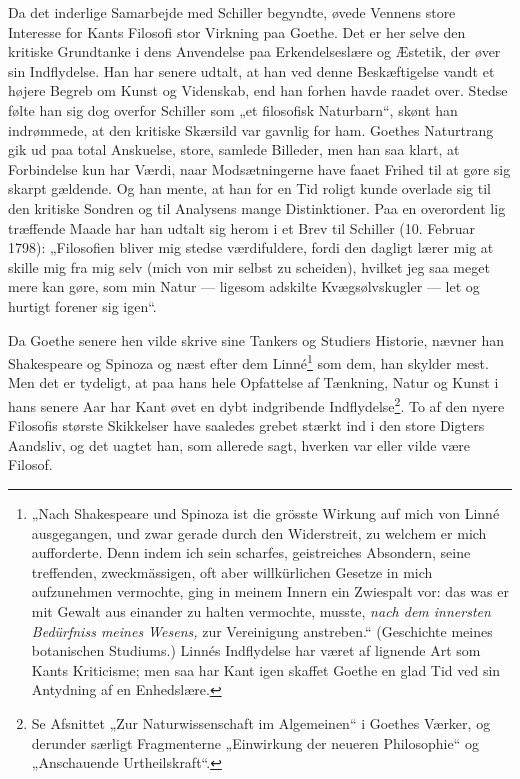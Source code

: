 \documentclass[12pt,a4paper,openany]{book}
\newcommand{\opage}[1]{\marginnote{\footnotesize\textit{[#1]}}}
\begin{document}
Da det inderlige Samarbejde med Schiller begyndte, øvede
Vennens store Interesse for Kants Filosofi stor Virkning paa
Goethe. Det er her selve den kritiske Grundtanke i dens Anvendelse
paa Erkendelseslære og Æstetik, der øver sin Indflydelse.
Han har senere udtalt, at han ved denne Beskæftigelse
vandt et højere Begreb om Kunst og Videnskab, end han forhen
havde raadet over. Stedse følte han sig dog overfor Schiller
som „et filosofisk Naturbarn“, skønt han indrømmede, at den
kritiske Skærsild var gavnlig for ham. Goethes Naturtrang gik
ud paa total Anskuelse, store, samlede Billeder, men han saa
klart, at Forbindelse kun har Værdi, naar Modsætningerne have
faaet Frihed til at gøre sig skarpt gældende. Og han mente, at
han for en Tid roligt kunde overlade sig til den kritiske Sondren
og til Analysens mange Distinktioner. Paa en overordent%
\setcounter{footnote}{0}%
\opage{166}lig træffende Maade har han udtalt sig herom i et Brev til
Schiller (10. Februar 1798): „Filosofien bliver mig stedse værdifuldere,
fordi den dagligt lærer mig at skille mig fra mig selv
(mich von mir selbst zu scheiden), hvilket jeg saa meget mere
kan gøre, som min Natur --- ligesom adskilte Kvægsølvskugler
--- let og hurtigt forener sig igen“.

Da Goethe senere hen vilde skrive sine Tankers og Studiers
Historie, nævner han Shakespeare og Spinoza og næst
efter dem Linné\footnote[1]{„Nach Shakespeare und Spinoza ist die grösste Wirkung auf mich von Linné ausgegangen, und zwar gerade durch den Widerstreit, zu welchem er mich aufforderte. Denn indem ich sein scharfes, geistreiches Absondern, seine treffenden, zweckmässigen, oft aber willkürlichen Gesetze in mich aufzunehmen vermochte, ging in meinem Innern ein Zwiespalt vor: das was er mit Gewalt aus einander zu halten vermochte, musste, \textit{nach dem innersten Bedürfniss meines Wesens,} zur Vereinigung anstreben.“ (Geschichte meines botanischen Studiums.) Linnés Indflydelse har været af lignende Art som Kants Kriticisme; men saa har Kant igen skaffet Goethe en glad Tid ved sin Antydning af en Enhedslære.} som dem, han skylder mest. Men det er
tydeligt, at paa hans hele Opfattelse af Tænkning, Natur og
Kunst i hans senere Aar har Kant øvet en dybt indgribende
Indflydelse\footnote[2]{Se Afsnittet „Zur Naturwissenschaft im Algemeinen“ i Goethes Værker, og derunder særligt Fragmenterne „Einwirkung der neueren Philosophie“ og „Anschauende Urtheilskraft“.}. To af den nyere Filosofis største Skikkelser have
saaledes grebet stærkt ind i den store Digters Aandsliv, og
det uagtet han, som allerede sagt, hverken var eller vilde være
Filosof.
\end{document}
